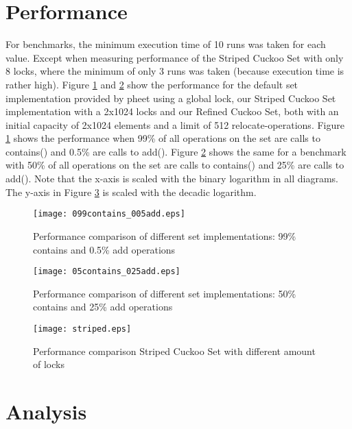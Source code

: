 \documentclass[a4paper,10pt]{article}
\begin{document}
\section{Performance}
\label{sec:performance}
For benchmarks, the minimum execution time of 10 runs was taken for each value. Except when measuring performance of the Striped Cuckoo Set with only 8 locks, where the minimum of only 3 runs was taken (because execution time is rather high).
\medskip
\newline
Figure \ref{fig:plot1} and \ref{fig:plot2} show the performance for the default set implementation provided by pheet using a global lock, our Striped Cuckoo Set implementation with a 2x1024 locks and our Refined Cuckoo Set, both with an initial capacity of 2x1024 elements and a limit of 512 relocate-operations. Figure \ref{fig:plot1} shows the performance when 99\% of all operations on the set are calls to contains() and 0.5\% are calls to add(). Figure \ref{fig:plot2} shows the same for a benchmark with 50\% of all operations on the set are calls to contains() and 25\% are calls to add().
\newline
Note that the x-axis is scaled with the binary logarithm in all diagrams. The y-axis in Figure \ref{fig:plot3} is scaled with the decadic logarithm.

\begin{figure}[H]
\begin{center}
\texttt{[image: 099contains\_005add.eps]}
\end{center}
\caption{Performance comparison of different set implementations: 99\% contains and 0.5\% add operations}
\label{fig:plot1}
\end{figure}

\begin{figure}[H]
\begin{center}
\texttt{[image: 05contains\_025add.eps]}
\end{center}
\caption{Performance comparison of different set implementations: 50\% contains and 25\% add operations}
\label{fig:plot2}
\end{figure}

\begin{figure}[H]
\begin{center}
\texttt{[image: striped.eps]}
\end{center}
\caption{Performance comparison Striped Cuckoo Set with different amount of locks}
\label{fig:plot3}
\end{figure}

\section{Analysis}
\label{sec:analysis}
\end{document}
